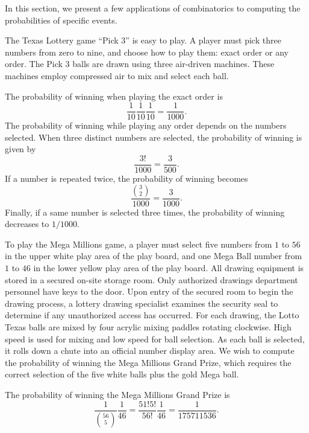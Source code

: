 In this section, we present a few applications of combinatorics to computing the probabilities of specific events.

\begin{example}
The Texas Lottery game ``Pick $3$'' is easy to play.
A player must pick three numbers from zero to nine, and choose how to play them: exact order or any order.
The Pick $3$ balls are drawn using three air-driven machines.
These machines employ compressed air to mix and select each ball.

The probability of winning when playing the exact order is
\begin{equation*}
\frac{1}{10} \frac{1}{10} \frac{1}{10}
= \frac{1}{1000} .
\end{equation*}
The probability of winning while playing any order depends on the numbers selected.
When three distinct numbers are selected, the probability of winning is given by
\begin{equation*}
\frac{3!}{1000} = \frac{3}{500} .
\end{equation*}
If a number is repeated twice, the probability of winning becomes
\begin{equation*}
\frac{\binom{3}{2}}{1000} = \frac{3}{1000} .
\end{equation*}
Finally, if a same number is selected three times, the probability of winning decreases to $1/1000$.
\end{example}

\begin{example}
To play the Mega Millions game, a player must select five numbers from $1$ to $56$ in the upper white play area of the play board, and one Mega Ball number from $1$ to $46$ in the lower yellow play area of the play board.
All drawing equipment is stored in a secured on-site storage room.
Only authorized drawings department personnel have keys to the door.
Upon entry of the secured room to begin the drawing process, a lottery drawing specialist examines the security seal to determine if any unauthorized access has occurred.
For each drawing, the Lotto Texas balls are mixed by four acrylic mixing paddles rotating clockwise.
High speed is used for mixing and low speed for ball selection.
As each ball is selected, it rolls down a chute into an official number display area.
We wish to compute the probability of winning the Mega Millions Grand Prize, which requires the correct selection of the five white balls plus the gold Mega ball.

The probability of winning the Mega Millions Grand Prize is
\begin{equation*}
\frac{1}{\binom{56}{5}} \frac{1}{46}
= \frac{51!5!}{56!} \frac{1}{46}
= \frac{1}{175 711 536} .
\end{equation*}
\end{example}

